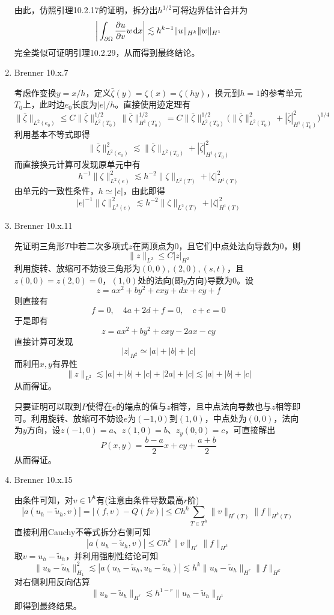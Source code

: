 \documentclass[a4paper,UTF8,fontset=windows,10pt]{ctexart}
\newcommand*{\dr}{\hspace{0.07em}\mathrm{d}}
\begin{document}
\begin{enumerate}
    由此，仿照引理10.2.17的证明，拆分出$h^{1/2}$可将边界估计合并为
    $$\bigg|\int_{\partial\Omega}\frac{\partial u}{\partial v}w\dr x\bigg|\lesssim h^{k-1}\|u\|_{H^k}\|w\|_{H^1}$$
    完全类似可证明引理10.2.29，从而得到最终结论。
    
    \item Brenner 10.x.7
    
    考虑作变换$y=x/h$，定义$\bar{\zeta}(y)=\zeta(x)=\zeta(hy)$，换元到$h=1$的参考单元$T_0$上，此时边$e_0$长度为$|e|/h$。直接使用迹定理有
    $$\|\bar{\zeta}\|_{L^2(e_0)}\le C\|\bar{\zeta}\|_{L^2(T_0)}^{1/2}\|\bar{\zeta}\|_{H^1(T_0)}^{1/2}=C\|\bar{\zeta}\|_{L^2(T_0)}^{1/2}\big(\|\bar{\zeta}\|_{L^2(T_0)}^2+|\bar{\zeta}|_{H^1(T_0)}^2\big)^{1/4}$$
    利用基本不等式即得
    $$\|\bar{\zeta}\|_{L^2(e_0)}^2\lesssim\|\bar{\zeta}\|_{L^2(T_0)}+|\bar{\zeta}|_{H^1(T_0)}^2$$
    而直接换元计算可发现原单元中有
    $$h^{-1}\|\zeta\|_{L^2(e)}^2\lesssim h^{-2}\|\zeta\|_{L^2(T)}+|\zeta|_{H^1(T)}^2$$
    由单元的一致性条件，$h\simeq|e|$，由此即得
    $$|e|^{-1}\|\zeta\|_{L^2(e)}^2\lesssim h^{-2}\|\zeta\|_{L^2(T)}+|\zeta|_{H^1(T)}^2$$
    
    \item Brenner 10.x.11
    
    先证明三角形$T$中若二次多项式$z$在两顶点为0，且它们中点处法向导数为0，则
    $$\|z\|_{L^2}\le C|z|_{H^2}$$
    利用旋转、放缩可不妨设三角形为$(0,0),(2,0),(s,t)$，且$z(0,0)=z(2,0)=0$，$(1,0)$处的法向(即$y$方向)导数为0。设
    $$z=ax^2+by^2+cxy+dx+ey+f$$
    则直接有
    $$f=0,\quad 4a+2d+f=0,\quad c+e=0$$
    于是即有
    $$z=ax^2+by^2+cxy-2ax-cy$$
    直接计算可发现
    $$|z|_{H^2}\simeq|a|+|b|+|c|$$
    而利用$x,y$有界性
    $$\|z\|_{L^2}\lesssim|a|+|b|+|c|+|2a|+|c|\lesssim|a|+|b|+|c|$$
    从而得证。
    
    只要证明可以取到$P$使得在$e$的端点的值与$z$相等，且中点法向导数也与$z$相等即可。利用旋转、放缩可不妨设$e$为$(-1,0)$到$(1,0)$，中点处为$(0,0)$，法向为$y$方向，设$z(-1,0)=a$、$z(1,0)=b$、$z_y(0,0)=c$，可直接解出
    $$P(x,y)=\frac{b-a}{2}x+cy+\frac{a+b}{2}$$
    从而得证。
    
    \item Brenner 10.x.15
    
    由条件可知，对$v\in V^h$有(注意由条件导数最高$r$阶)
    $$|a(u_h-\tilde{u}_h,v)|=|(f,v)-Q(fv)|\le Ch^k\sum_{T\in T^h}\|v\|_{H^r(T)}\|f\|_{H^k(T)}$$
    直接利用Cauchy不等式拆分右侧可知
    $$|a(u_h-\tilde{u}_h,v)|\le Ch^k\|v\|_{H^r}\|f\|_{H^k}$$
    取$v=u_h-\tilde{u}_h$，并利用强制性结论可知
    $$\|u_h-\tilde{u}_h\|_{H_1}^2\lesssim|a(u_h-\tilde{u}_h,u_h-\tilde{u}_h)|\lesssim h^k\|u_h-\tilde{u}_h\|_{H^r}\|f\|_{H^k}$$
    对右侧利用反向估算
    $$\|u_h-\tilde{u}_h\|_{H^r}\lesssim h^{1-r}\|u_h-\tilde{u}_h\|_{H^1}$$
    即得到最终结果。
    

\end{enumerate}
\end{document}
